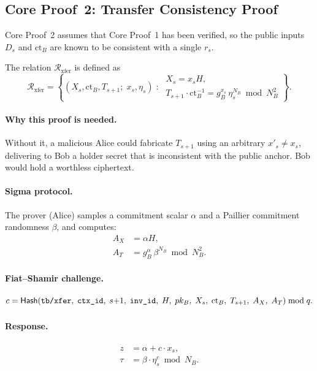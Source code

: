 \subsection{Core Proof~2: Transfer Consistency Proof}\label{sec:proof2}

Core Proof~2 assumes that Core Proof~1 has been verified, so the public inputs $D_s$ and $\mathrm{ct}_B$ are known to be consistent with a single $r_s$.

\begin{definition}\label{def:xfer-relation}
The relation $\mathcal{R}_{\mathrm{xfer}}$ is defined as
$$
\mathcal{R}_{\mathrm{xfer}} = \left\{
  (X_s, \mathrm{ct}_B, T_{s+1} ;\; x_s, \eta_s) \;:\;
  \begin{array}{l}
  X_s = x_s H, \\[2pt]
  T_{s+1} \cdot \mathrm{ct}_B^{-1} = g_B^{x_s}\, \eta_s^{N_B} \bmod N_B^2
  \end{array}
\right\}.
$$
\end{definition}

\paragraph{Why this proof is needed.} Without it, a malicious Alice could fabricate $T_{s+1}$ using an arbitrary $x'_s \neq x_s$, delivering to Bob a holder secret that is inconsistent with the public anchor. Bob would hold a worthless ciphertext.

\paragraph{Sigma protocol.} The prover (Alice) samples a commitment scalar $\alpha$ and a Paillier commitment randomness $\beta$, and computes:
\begin{align*}
A_X &= \alpha H, \\
A_T &= g_B^{\alpha}\, \beta^{N_B} \bmod N_B^2.
\end{align*}

\paragraph{Fiat--Shamir challenge.}
$$
c = \mathsf{Hash}\!\left(\texttt{tb/xfer},\; \texttt{ctx\_id},\; s{+}1,\; \texttt{inv\_id},\; H,\; pk_B,\; X_s,\; \mathrm{ct}_B,\; T_{s+1},\; A_X,\; A_T\right) \bmod q.
$$

\paragraph{Response.}
\begin{align*}
z &= \alpha + c \cdot x_s, \\
\tau &= \beta \cdot \eta_s^c \bmod N_B.
\end{align*}

